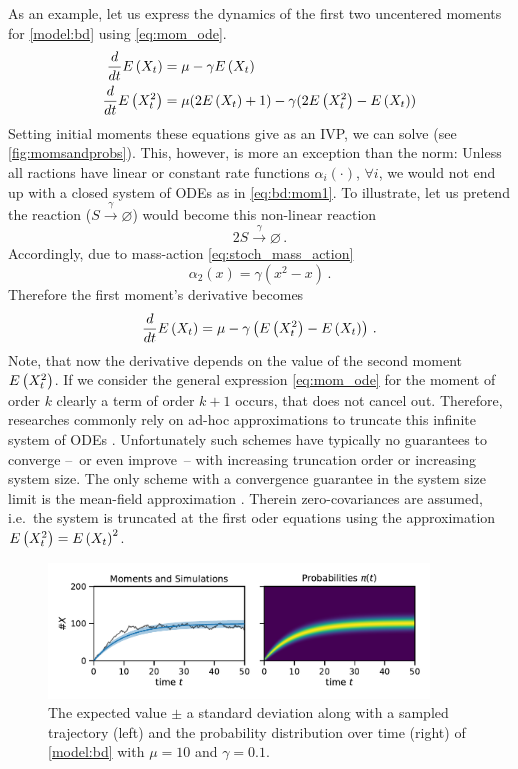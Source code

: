 As an example, let us express the dynamics of the first two uncentered moments for \autoref{model:bd} using \eqref{eq:mom_ode}.
\begin{equation}\label{eq:bd:mom1}
	\begin{split}
	\frac{d}{dt}\E{X_t} =\; &\mu - \gamma \E{X_t}\\
	\frac{d}{dt}\E{X_t^2} =\; &\mu(2\E{X_t} + 1) - \gamma (2\E{X_t^2}-\E{X_t})%
	\end{split}
\end{equation}
Setting initial moments these equations give as an \ac{IVP}, we can solve (see \autoref{fig:momsandprobs}).
This, however, is more an exception than the norm:
Unless all ractions have linear or constant rate functions $\alpha_i(\cdot)$, $\forall i$, we would not end up with a closed system of \acp{ODE} as in \eqref{eq:bd:mom1}.
To illustrate, let us pretend the reaction ($S\xrightarrow{\gamma}\varnothing$) would become this non-linear reaction
$$
2S\xrightarrow{\gamma}\varnothing\,.
$$
Accordingly, due to mass-action \eqref{eq:stoch_mass_action}
$$
\alpha_2(x)=\gamma (x^2 - x)\,.
$$
Therefore the first moment's derivative becomes
$$
\frac{d}{dt}{E}\left(X_t\right) =\mu - \gamma \left({E}\left(X_t^2\right) - {E}\left(X_t\right)\right)\,.
$$
Note, that now the derivative depends on the value of the second moment ${E}\left(X_t^2\right)$.
If we consider the general expression \eqref{eq:mom_ode} for the moment of order $k$ clearly a term of order $k+1$ occurs, that does not cancel out.
Therefore, researches commonly rely on ad-hoc approximations to truncate this infinite system of \acp{ODE} \cite{hespanha2008moment,schnoerr2015comparison,schnoerr2014validity}.
Unfortunately such schemes have typically no guarantees to converge --~or even improve~-- with increasing truncation order \cite{schnoerr2014validity} or increasing system size.
The only scheme with a convergence guarantee in the system size limit is the mean-field approximation \cite{bortolussi2013continuous}.
Therein zero-covariances are assumed, i.e.\ the system is truncated at the first oder equations using the approximation ${E}\left(X_t^2\right)={E}\left(X_t\right)^2$.
\begin{figure}[htb]
	\centering
	\includegraphics[width=0.9\textwidth]{gfx/momsandprobs.pdf}
	\caption[Moments and probability distribution $\pi(t)$]{\label{fig:momsandprobs}The expected value $\pm$ a standard deviation along with a sampled trajectory (left) and the probability distribution over time (right) of \autoref{model:bd} with $\mu=10$ and $\gamma=0.1$.}
\end{figure}

